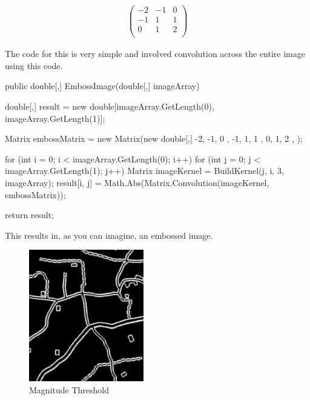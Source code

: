\begin{FlushLeft}
        \begin{gather*}
            \begin{pmatrix}
                -2 & -1 & 0 \\
                -1 & 1  & 1 \\
                0  & 1  & 2 \\
            \end{pmatrix}
        \end{gather*}

        The code for this is very simple and involved convolution across the entire image using this code. \\ \bk

        \begin{cscode}
public double[,] EmbossImage(double[,] imageArray)
{
    double[,] result = new double[imageArray.GetLength(0), imageArray.GetLength(1)];

    Matrix embossMatrix = new Matrix(new double[,]
    {
        { -2, -1, 0 },
        { -1, 1, 1 },
        { 0, 1, 2 },
    });

    for (int i = 0; i < imageArray.GetLength(0); i++)
    {
        for (int j = 0; j < imageArray.GetLength(1); j++)
        {
            Matrix imageKernel = BuildKernel(j, i, 3, imageArray);
            result[i, j] = Math.Abs(Matrix.Convolution(imageKernel, embossMatrix));
        }
    }

    return result;
}
        \end{cscode}

        This results in, as you can imagine, an embossed image. \\ \bk

        \begin{figure}[H]
            \centering
            \includegraphics[width=5cm]{images/edgeDetectionPrototype/j.jpg}
            \caption{Magnitude Threshold}
            \label{fig:proto_embossedImage}
        \end{figure} \bk


\end{FlushLeft}

